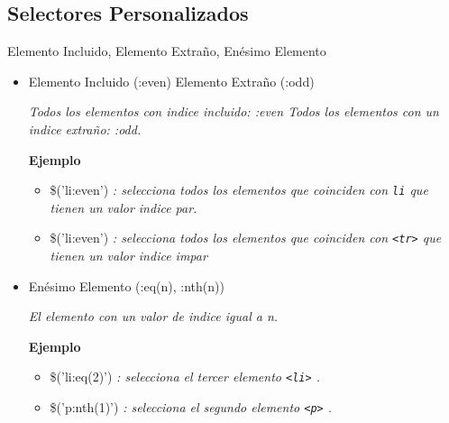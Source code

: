 \subsection{Selectores Personalizados} %

\begin{frame}[fragile]{Elemento Incluido,  Elemento Extraño, Enésimo Elemento}
\begin{itemize}
\item Elemento Incluido (:even) Elemento Extraño (:odd) 

\textit{Todos los elementos con indice incluido: 
  :even
Todos los elementos con un indice extraño:
  :odd.}

\textbf{Ejemplo}  
\begin{itemize}
    \item \$('li:even') \textit{: selecciona todos los elementos que coinciden
    con \texttt{li} que tienen un valor indice par.}
    \item \$('li:even') \textit{: selecciona todos los elementos que coinciden
    con \texttt{<tr>} que tienen un valor indice impar}
\end{itemize}

\item Enésimo Elemento (:eq(n), :nth(n)) 

\textit{El elemento con un valor de indice igual a n.}

\textbf{Ejemplo}
\begin{itemize}
    \item \$('li:eq(2)') \textit{: selecciona el tercer elemento \texttt{<li>} .}
    \item \$('p:nth(1)') \textit{: selecciona el segundo elemento \texttt{<p>} .}
\end{itemize}
\end{itemize}
\end{frame}

